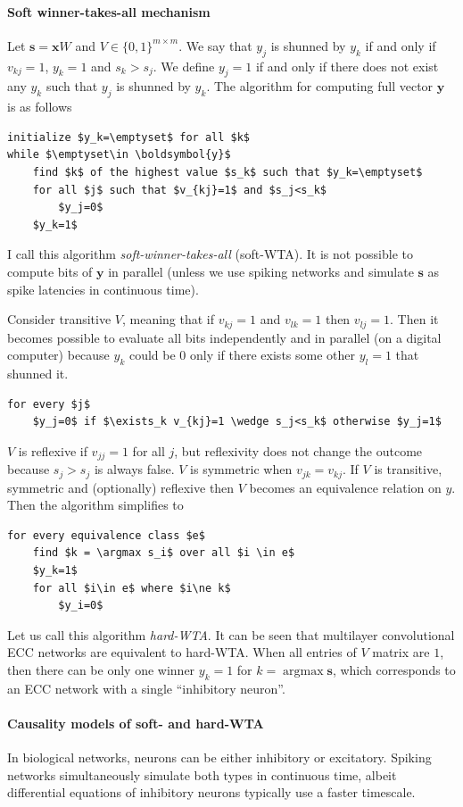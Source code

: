 \documentclass[12pt]{article}
\DeclareMathOperator*{\argmax}{argmax}
\begin{document}
\paragraph{Soft winner-takes-all mechanism} 
Let $\boldsymbol{s}=\boldsymbol{x} W$ and $V\in \{0,1\}^{m\times m}$. 
 We say that $y_j$ is shunned by $y_k$ if and only if  $v_{kj}=1$, $y_k=1$ and $s_k>s_j$. We define $y_j=1$ if and only if there does not exist any $y_k$ such that  $y_j$ is shunned by $y_k$. The algorithm for computing full vector $\boldsymbol{y}$ is as follows
\begin{lstlisting}
initialize $y_k=\emptyset$ for all $k$
while $\emptyset\in \boldsymbol{y}$
    find $k$ of the highest value $s_k$ such that $y_k=\emptyset$
    for all $j$ such that $v_{kj}=1$ and $s_j<s_k$
        $y_j=0$ 
    $y_k=1$
\end{lstlisting}
I call this algorithm \textit{soft-winner-takes-all} (soft-WTA).
It is not possible to compute bits of $\boldsymbol{y}$ in parallel (unless we use spiking networks and simulate $\boldsymbol{s}$ as spike latencies in continuous time). 

 Consider transitive $V$, meaning that if $v_{kj}=1$ and $v_{lk}=1$ then $v_{lj}=1$. Then it becomes possible to evaluate all bits independently and in parallel (on a digital computer) because  $y_{k}$ could be $0$ only if there exists some other $y_l=1$ that shunned it.
\begin{lstlisting}
for every $j$
    $y_j=0$ if $\exists_k v_{kj}=1 \wedge s_j<s_k$ otherwise $y_j=1$
\end{lstlisting}
$V$ is reflexive if $v_{jj}=1$ for all $j$, but reflexivity does not change the outcome because $s_j > s_j$ is always false. $V$ is  symmetric when  $v_{jk}=v_{kj}$. If $V$ is transitive, symmetric and (optionally) reflexive then $V$ becomes an equivalence relation on $y$. Then the algorithm simplifies to
\begin{lstlisting}
for every equivalence class $e$
    find $k = \argmax s_i$ over all $i \in e$
    $y_k=1$ 
    for all $i\in e$ where $i\ne k$
        $y_i=0$ 
\end{lstlisting}
Let us call this algorithm \textit{hard-WTA}.
It can be seen that multilayer convolutional ECC networks are equivalent to hard-WTA.
When all entries of $V$ matrix are $1$, then there can be only one winner $y_k=1$ for $k=\argmax \boldsymbol{s}$, which corresponds to an ECC network with a single ``inhibitory neuron''. 

\paragraph{Causality models of soft- and hard-WTA}
In biological networks, neurons can be either inhibitory or excitatory. Spiking networks simultaneously simulate both types in continuous time, albeit differential equations of inhibitory neurons typically use a faster timescale. 
\end{document}
